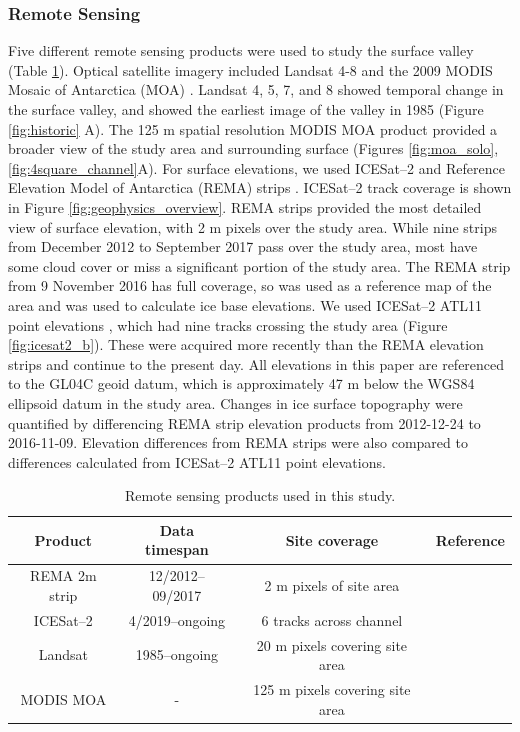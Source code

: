 \subsubsection{Remote Sensing} \label{sec:remote}

Five different remote sensing products were used to study the surface valley (Table \ref{tab:remote_table}). Optical satellite imagery included Landsat 4-8 \citep{RoyLandsat8Scienceproduct2014} and the 2009 MODIS Mosaic of Antarctica (MOA) \citep{haran2014modis}. Landsat 4, 5, 7, and 8 showed temporal change in the surface valley, and showed the earliest image of the valley in 1985 (Figure \ref{fig:historic} A). The 125 m spatial resolution MODIS MOA product provided a broader view of the study area and surrounding surface (Figures \ref{fig:moa_solo}, \ref{fig:4square_channel}A). For surface elevations, we used ICESat--2 and Reference Elevation Model of Antarctica (REMA) strips \citep{howat2019reference,smith2021v3}. ICESat--2 track coverage is shown in Figure \ref{fig:geophysics_overview}. REMA strips provided the most detailed view of surface elevation, with 2 m pixels over the study area. While nine strips from December 2012 to September 2017 pass over the study area, most have some cloud cover or miss a significant portion of the study area. The REMA strip from 9 November 2016 has full coverage, so was used as a reference map of the area and was used to calculate ice base elevations. We used ICESat--2 ATL11 point elevations \citep{smith2021v3}, which had nine tracks crossing the study area (Figure \ref{fig:icesat2_b}). These were acquired more recently than the REMA elevation strips and continue to the present day.   All elevations in this paper are referenced to the GL04C geoid datum, which is approximately 47 m below the WGS84 ellipsoid datum in the study area. Changes in ice surface topography were quantified by differencing REMA strip elevation products  from 2012-12-24 to 2016-11-09. Elevation differences from REMA strips were also compared to differences calculated from ICESat--2 ATL11 point elevations.



\begin{table}
\centering
\begin{tabular}{ |c|c c c| } 
 \hline
 Product & Data timespan & Site coverage &  Reference \\ 
 \hline
 REMA 2m strip &  12/2012--09/2017 & 2 m pixels of site area 
 & \cite{howat2019reference}\\ 
 ICESat--2 &  4/2019--ongoing &  6 tracks across channel  & \cite{smith2021v3}\\
 Landsat &  1985--ongoing & 20 m pixels covering site area  & \cite{RoyLandsat8Scienceproduct2014}\\ 
 MODIS MOA & - & 125 m pixels covering site area  & \cite{haran2014modis}\\
 \hline
\end{tabular}
\label{tab:remote_table}
\caption{Remote sensing products used in this study.}
\end{table}


